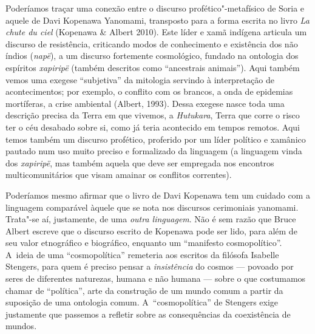 Poderíamos traçar uma conexão entre o discurso profético"-metafísico de
Soria e aquele de Davi Kopenawa Yanomami, transposto para
a forma escrita no livro \emph{La chute du ciel} (Kopenawa \& Albert 2010).
Este líder e xamã indígena articula um discurso de resistência,
criticando modos de conhecimento e existência dos não índios (\emph{napë}), a
um discurso fortemente cosmológico, fundado na ontologia dos espíritos
\emph{xapiripë} (também descritos como ``ancestrais animais''). Aqui também
vemos uma exegese ``subjetiva'' da mitologia servindo à interpretação de
acontecimentos; por exemplo, o conflito com os brancos, a onda de
epidemias mortíferas, a crise ambiental (Albert, 1993). Dessa exegese
nasce toda uma descrição precisa da Terra em que vivemos, a \emph{Hutukara},
Terra que corre o risco ter o céu desabado sobre si, como já teria
acontecido em tempos remotos. Aqui temos também um discurso profético,
proferido por um líder político e xamânico pautado num uso muito
preciso e formalizado da linguagem (a linguagem vinda dos \emph{xapiripë}, mas
também aquela que deve ser empregada nos encontros multicomunitários
que visam amainar os conflitos correntes). 

Poderíamos mesmo afirmar que o livro de Davi Kopenawa tem um cuidado com
a linguagem comparável àquele que se nota nos discursos cerimoniais
yanomami. Trata"-se aí, justamente, de uma \emph{outra linguagem}. Não é sem
razão que Bruce Albert escreve que o discurso escrito de Kopenawa pode
ser lido, para além de seu valor etnográfico e biográfico, enquanto um
``manifesto cosmopolítico''. A~ideia de uma ``cosmopolítica'' remeteria aos
escritos da filósofa Isabelle Stengers, para quem é preciso pensar a
\emph{insistência} do cosmos --- povoado por seres de diferentes naturezas,
humana e não humana --- sobre o que costumamos chamar de ``política'', arte
da construção de um mundo comum a partir da suposição de uma ontologia
comum. A~``cosmopolítica'' de Stengers exige justamente que passemos a
refletir sobre as consequências da coexistência de mundos.

